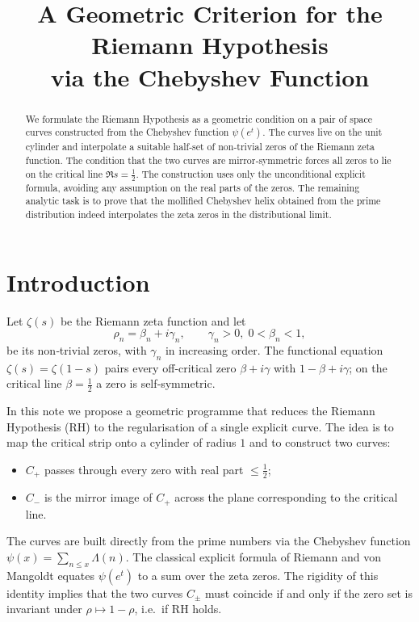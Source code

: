 \documentclass[12pt,a4paper]{article}
\title{\bf A Geometric Criterion for the Riemann Hypothesis\\ via the Chebyshev Function}
\author{}
\date{}
\begin{document}
\maketitle

\begin{abstract}
We formulate the Riemann Hypothesis as a geometric condition on a pair of space curves
constructed from the Chebyshev function \(\psi(e^t)\).  The curves live on the unit cylinder
and interpolate a suitable half‑set of non‑trivial zeros of the Riemann zeta function.
The condition that the two curves are mirror‑symmetric forces all zeros to lie on the
critical line \(\Re s = \tfrac12\).  The construction uses only the unconditional explicit formula,
avoiding any assumption on the real parts of the zeros.  The remaining analytic task is to
prove that the mollified Chebyshev helix obtained from the prime distribution indeed
interpolates the zeta zeros in the distributional limit.
\end{abstract}

\section{Introduction}

Let \(\zeta(s)\) be the Riemann zeta function and let
\[
\rho_n = \beta_n + i\gamma_n,\qquad \gamma_n>0,\; 0<\beta_n<1,
\]
be its non‑trivial zeros, with \(\gamma_n\) in increasing order.  The functional equation
\(\zeta(s)=\zeta(1-s)\) pairs every off‑critical zero \(\beta+i\gamma\) with \(1-\beta+i\gamma\);
on the critical line \(\beta=\frac12\) a zero is self‑symmetric.

In this note we propose a geometric programme that reduces the Riemann Hypothesis (RH)
to the regularisation of a single explicit curve.  The idea is to map the critical strip
onto a cylinder of radius \(1\) and to construct two curves:
\begin{itemize}
\item \(C_+\) passes through every zero with real part \(\le \frac12\);
\item \(C_-\) is the mirror image of \(C_+\) across the plane corresponding to the
      critical line.
\end{itemize}
The curves are built directly from the prime numbers via the Chebyshev function
\(\psi(x)=\sum_{n\le x}\Lambda(n)\).  The classical explicit formula of Riemann and
von Mangoldt equates \(\psi(e^t)\) to a sum over the zeta zeros.  The rigidity of
this identity implies that the two curves \(C_\pm\) must coincide if and only if the
zero set is invariant under \(\rho\mapsto1-\rho\), i.e.\ if RH holds.
\end{document}
